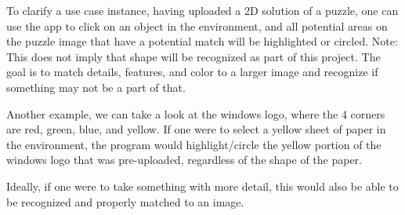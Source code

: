\documentclass[letter,10pt]{article}
\begin{document}
\begin{multicols}{2}
        To clarify a use case instance, having uploaded a 2D solution of a puzzle, one can use the app to click on an object in the environment, and all potential areas on the puzzle image that have a potential match will be highlighted or circled. Note: This does not imply that shape will be recognized as part of this project. The goal is to match details, features, and color to a larger image and recognize if something may not be a part of that.
        \par
        Another example, we can take a look at the windows logo, where the 4 corners are red, green, blue, and yellow. If one were to select a yellow sheet of paper in the environment, the program would highlight/circle the yellow portion of the windows logo that was pre-uploaded, regardless of the shape of the paper.
        \par
        Ideally, if one were to take something with more detail, this would also be able to be recognized and properly matched to an image.
        

\end{multicols}
\end{document}
